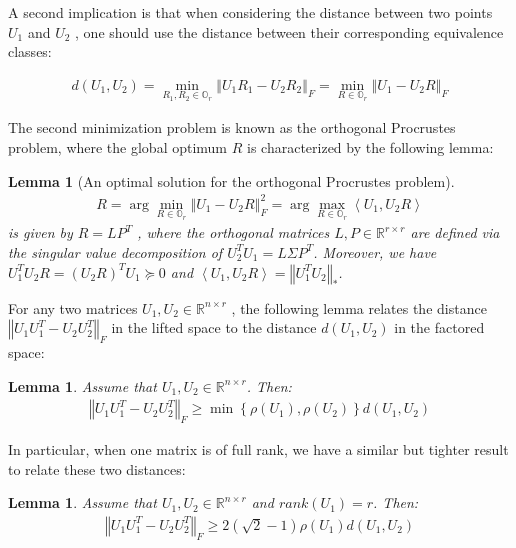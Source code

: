 \documentclass{article}
\newtheorem{lemma}[theorem]{Lemma}
\begin{document}
A second implication is that when considering the distance between two points $U_1$ and $U_2$ , one should use the distance between their corresponding equivalence classes:

\begin{align*}
    d\left(U_1,U_2\right)=\min_{R_1,R_2\in \mathbb{O}_r}\left\Vert U_1R_1 - U_2R_2\right\Vert_F = \min_{R\in \mathbb{O}_r}\left\Vert U_1 - U_2R\right\Vert _F
\end{align*}

The second minimization problem is known as the orthogonal Procrustes problem, where the global optimum $R$ is characterized by the following lemma:

\begin{lemma}[An optimal solution for the orthogonal Procrustes problem]
    \begin{align*}
        R=\arg\min_{R\in \mathbb{O}_r}\left\Vert U_1 - U_2R\right\Vert _F^2=\arg\max_{R\in \mathbb{O}_r}\left<U_1,U_2R\right>
    \end{align*}
    is given by $R=LP^T$ , where the orthogonal matrices $L,P \in \mathbb{R}^{r\times r}$ are defined via the singular value decomposition of $U_2^T U_1=L\Sigma P^T$. Moreover, we have $U_1^T U_2R = {(U_2 R)}^T U_1\succeq 0$ and $\left< U_1, U_2R \right> = {\left\Vert U_1^T U_2 \right\Vert}_*$.
\end{lemma}

For any two matrices $U_1, U_2 \in \mathbb{R}^{n\times r}$ , the following lemma relates the distance $\left\Vert U_1U_1^T - U_2U_2^T \right\Vert_F$ in the lifted space to the distance $d(U_1, U_2)$ in the factored space:


\begin{lemma}
Assume that $U_1, U_2 \in \mathbb{R}^{n\times r}$. Then:
    \begin{align*}
        \left\Vert U_1U_1^T - U_2U_2^T \right\Vert_F \ge \min\left\{\rho\left(U_1\right), \rho\left(U_2\right)\right\}d\left(U_1, U_2\right)
    \end{align*}
\end{lemma}

In particular, when one matrix is of full rank, we have a similar but tighter result to relate these two distances:

\begin{lemma}
Assume that $U_1, U_2 \in \mathbb{R}^{n\times r}$ and $rank\left(U_1\right)=r$. Then:
    \begin{align*}
        \left\Vert U_1U_1^T - U_2U_2^T \right\Vert_F \ge 2\left(\sqrt{2}-1\right)\rho\left(U_1\right)d\left(U_1, U_2\right)
    \end{align*}
\end{lemma}



\end{document}
